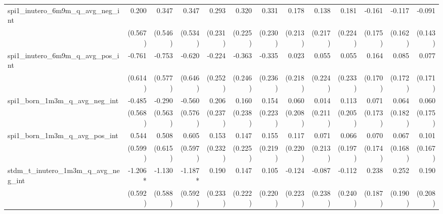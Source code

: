 \begin{tabular}{lrrrrrrrrrrrr}
spi1\_inutero\_6m9m\_q\_avg\_neg\_int       &        0.200 &        0.347 &        0.347 &        0.293 &        0.320 &        0.331 &        0.178 &        0.138 &        0.181 &       -0.161 &       -0.117 &       -0.091 \\ 
                                            &      (0.567) &      (0.546) &      (0.534) &      (0.231) &      (0.225) &      (0.230) &      (0.213) &      (0.217) &      (0.224) &      (0.175) &      (0.162) &      (0.143) \\ 
spi1\_inutero\_6m9m\_q\_avg\_pos\_int       &       -0.761 &       -0.753 &       -0.620 &       -0.224 &       -0.363 &       -0.335 &        0.023 &        0.055 &        0.055 &        0.164 &        0.085 &        0.077 \\ 
                                            &      (0.614) &      (0.577) &      (0.646) &      (0.252) &      (0.246) &      (0.236) &      (0.218) &      (0.224) &      (0.233) &      (0.170) &      (0.172) &      (0.171) \\ 
spi1\_born\_1m3m\_q\_avg\_neg\_int          &       -0.485 &       -0.290 &       -0.560 &        0.206 &        0.160 &        0.154 &        0.060 &        0.014 &        0.113 &        0.071 &        0.064 &        0.060 \\ 
                                            &      (0.568) &      (0.563) &      (0.576) &      (0.237) &      (0.238) &      (0.223) &      (0.208) &      (0.211) &      (0.205) &      (0.173) &      (0.182) &      (0.175) \\ 
spi1\_born\_1m3m\_q\_avg\_pos\_int          &        0.544 &        0.508 &        0.605 &        0.153 &        0.147 &        0.155 &        0.117 &        0.071 &        0.066 &        0.070 &        0.067 &        0.101 \\ 
                                            &      (0.599) &      (0.615) &      (0.597) &      (0.232) &      (0.225) &      (0.219) &      (0.220) &      (0.213) &      (0.197) &      (0.174) &      (0.168) &      (0.167) \\ 
stdm\_t\_inutero\_1m3m\_q\_avg\_neg\_int    &      -1.206* &       -1.130 &      -1.187* &        0.190 &        0.147 &        0.105 &       -0.124 &       -0.087 &       -0.112 &        0.238 &        0.252 &        0.190 \\ 
                                            &      (0.592) &      (0.588) &      (0.592) &      (0.233) &      (0.222) &      (0.220) &      (0.223) &      (0.238) &      (0.240) &      (0.187) &      (0.190) &      (0.208) \\ 

\end{tabular}
